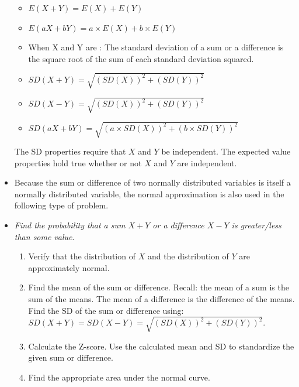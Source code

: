 \begin{itemize}
\begin{itemize}
\item[] $E(X+Y) = E(X) + E(Y)$
  
\item[] $E(aX+bY) = a\times E(X) + b\times E(Y)$
\end{itemize}

\begin{itemize}
\item When X and Y are : 
The standard deviation of a sum or a difference is the square root of the sum of each standard deviation squared. 
\item[]
  $SD(X + Y) =  \sqrt{(SD(X))^2 + (SD(Y))^2}$ 

\item[] $SD(X - Y) =  \sqrt{(SD(X))^2 + (SD(Y))^2}$
  
\item[] $SD(aX + bY) = \sqrt{(a\times SD(X))^2 + (b\times SD(Y))^2}$
 
\end{itemize}

The SD properties require that $X$ and $Y$ be independent.  The expected value properties hold true whether or not $X$ and $Y$ are independent.

\item Because the sum or difference of two normally distributed variables is itself a normally distributed variable, the normal approximation is also used in the following type of problem.
\item[] \textit{Find the probability that a sum $X+Y$ or a difference $X-Y$ is greater/less than some value}.
\begin{enumerate}\vspace{-1mm}
\setlength{\itemsep}{0mm}
\item Verify that the distribution of $X$ and the distribution of $Y$ are approximately normal.  
\item Find the mean of the sum or difference.  Recall: the mean of a sum is the 
\\sum of the means.  The mean of a difference is the difference of the means.  
\\Find the SD of the sum or difference using:  
\\$SD(X+Y) = SD(X - Y) =  \sqrt{(SD(X))^2 + (SD(Y))^2}$.
\item Calculate the Z-score.  Use the calculated mean and SD to standardize the given sum or difference.
\item Find the appropriate area under the normal curve. 
\end{enumerate}

\end{itemize}



